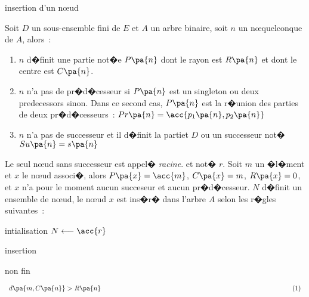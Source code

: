         \begin{xalgorithm}{insertion d'un n\oe ud}\label{algorithm_insertion}
        
        Soit $D$ un sous-ensemble fini de $E$ et $A$ un arbre binaire, soit $n$ un n\oe quelconque de $A$, alors~:
            \begin{enumerate}
            \item $n$ d�finit une partie not�e $P\pa{n}$ dont le rayon est $R\pa{n}$ et 
                            dont le centre est $C\pa{n}$.
            \item $n$ n'a pas de pr�d�cesseur si $P\pa{n}$ est 
                            un singleton ou deux predecessors
                    sinon. Dans ce second cas, $P\pa{n}$ est la r�union des parties de deux pr�d�cesseurs~:
                     $Pr\pa{n} = \acc{ p_1\pa{n} , p_2\pa{n}}$
            \item $n$ n'a pas de successeur et il d�finit la partiet $D$ 
                                    ou un successeur not� $Su\pa{n} = s\pa{n}$
            \end{enumerate}
        
        Le seul n\oe ud sans successeur est appel� \emph{racine}. et not� $r$. 
        Soit $m$ un �l�ment et $x$
        le n\oe ud associ�, alors $P\pa{x} = \acc{m}$, $C\pa{x} = m$, $R\pa{x} = 0$, et $x$ n'a 
        pour le moment aucun succeseur
        et aucun pr�d�cesseur. $N$ d�finit un ensemble de n\oe ud, le n\oe ud $x$ est ins�r� dans l'arbre $A$ 
        selon les r�gles suivantes~:
        
        \begin{xalgostep}{intialisation}
            $N \longleftarrow \acc{r}$
        \end{xalgostep}
        
        
        \begin{xalgostep}{insertion}
            \begin{xwhile}{non fin}
        
                \begin{xif}{$
                            \begin{array}{l} d\pa{m,C\pa{n}} > R\pa{n}
                            \hspace{10cm}
                            \refstepcounter{equation}(\theequation)
                            \label{amelioration_insertion_1}
                            \end{array}
                            $}
        

\end{xif}
\end{xwhile}
\end{xalgostep}
\end{xalgorithm}

